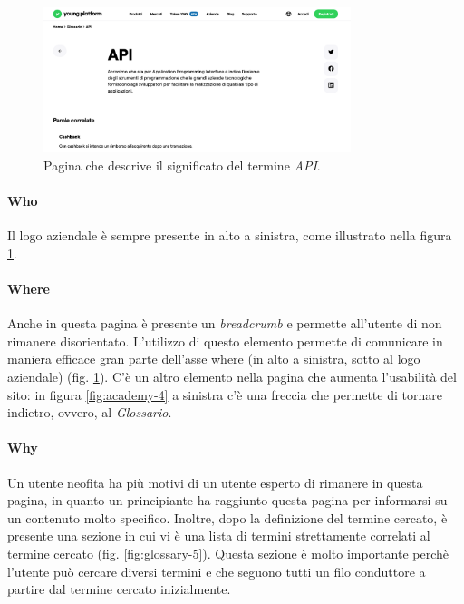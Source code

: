 \begin{figure}[H]
  \centering
  \includegraphics[width=0.80\textwidth]{res/images/internal-pages/glossary/glossary-4.png}
  \caption{Pagina che descrive il significato del termine \textit{API}.}
  \label{fig:glossary-4}
\end{figure}

\paragraph{Who}

Il logo aziendale è sempre presente in alto a sinistra, come illustrato 
nella figura \ref{fig:glossary-4}.

\paragraph{Where}

Anche in questa pagina è presente un \textit{breadcrumb} e permette 
all'utente di non rimanere disorientato. L'utilizzo di questo elemento 
permette di comunicare in maniera efficace gran parte dell'asse where 
(in alto a sinistra, sotto al logo aziendale) (fig. \ref{fig:glossary-4}). 
C'è un altro elemento nella pagina che aumenta l'usabilità del sito: 
in figura \ref{fig:academy-4} a sinistra c'è una freccia che permette di 
tornare indietro, ovvero, al \textit{Glossario}. 

\paragraph{Why}

Un utente neofita ha più motivi di un utente esperto di rimanere in questa 
pagina, in quanto un principiante ha raggiunto questa pagina per informarsi 
su un contenuto molto specifico. Inoltre, dopo la definizione del termine 
cercato, è presente una sezione in cui vi è una lista di termini 
strettamente correlati al termine cercato (fig. \ref{fig:glossary-5}). 
Questa sezione è molto importante perchè l'utente può cercare diversi 
termini e che seguono tutti un filo conduttore a partire dal termine 
cercato inizialmente. 


